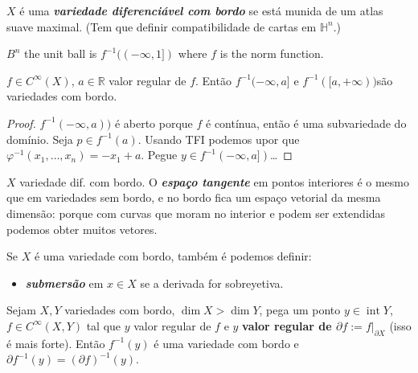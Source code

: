 \begin{defn}\leavevmode
\(X\) é uma \textit{\textbf{variedade diferenciável com bordo}} se está munida de um atlas suave maximal. (Tem que definir compatibilidade de cartas em \(\mathbb{H}^n\).)
\end{defn}

\begin{example}[Look!]\leavevmode
	\(B^n\) the unit ball is \(f^{-1}((-\infty,1])\) where \(f\) is the norm function.
\end{example}

\begin{prop}\leavevmode
	\(f \in C^\infty(X)\), \(a \in \mathbb{R}\) valor regular de $f$. Então \(f^{-1}(-\infty,a]\) e \(f^{-1}([a,+\infty))\)são variedades com bordo.
\end{prop}

\begin{proof}\leavevmode
	\(f^{-1}(-\infty,a))\) é aberto porque $f$ é contínua, então é uma subvariedade do domínio. Seja \(p \in f^{-1}(a)\). Usando TFI podemos upor que \(\varphi^{-1}(x_1,\ldots,x_n)=-x_1+a\). Pegue \(y \in f^{-1}(-\infty,a])\)…
\end{proof}

\begin{defn}\leavevmode
\(X\) variedade dif. com bordo. O \textit{\textbf{espaço tangente}} em pontos interiores é o mesmo que em variedades sem bordo, e no bordo fica um espaço vetorial da mesma dimensão: porque com curvas que moram no interior e podem ser extendidas podemos obter muitos vetores.
\end{defn}

Se \(X\) é uma variedade com bordo, também é podemos definir:

\begin{itemize}
\item \textit{\textbf{submersão}} em \(x \in X\) se a derivada for sobreyetiva.
\end{itemize}

\begin{prop}\leavevmode
	Sejam \(X,Y\) variedades com bordo, \(\dim X > \dim Y\), pega um ponto \(y \in \operatorname{ in t}Y\), \(f \in C^\infty(X,Y)\) tal que \(y\) valor regular de $f$ e \(y\) \textbf{valor regular de \(\partial f:=f|_{\partial X}\) } (isso é mais forte). Então \(f^{-1}(y)\) é uma variedade com bordo e \(\partial f^{-1}(y)=(\partial f)^{-1}(y)\).
\end{prop}


